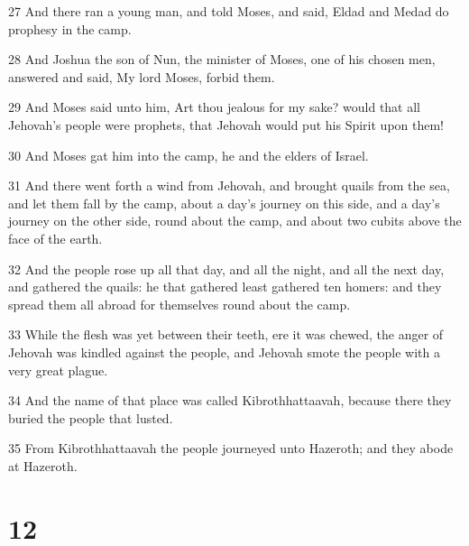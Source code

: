 \par 27 And there ran a young man, and told Moses, and said, Eldad and Medad do prophesy in the camp.
\par 28 And Joshua the son of Nun, the minister of Moses, one of his chosen men, answered and said, My lord Moses, forbid them.
\par 29 And Moses said unto him, Art thou jealous for my sake? would that all Jehovah's people were prophets, that Jehovah would put his Spirit upon them!
\par 30 And Moses gat him into the camp, he and the elders of Israel.
\par 31 And there went forth a wind from Jehovah, and brought quails from the sea, and let them fall by the camp, about a day's journey on this side, and a day's journey on the other side, round about the camp, and about two cubits above the face of the earth.
\par 32 And the people rose up all that day, and all the night, and all the next day, and gathered the quails: he that gathered least gathered ten homers: and they spread them all abroad for themselves round about the camp.
\par 33 While the flesh was yet between their teeth, ere it was chewed, the anger of Jehovah was kindled against the people, and Jehovah smote the people with a very great plague.
\par 34 And the name of that place was called Kibrothhattaavah, because there they buried the people that lusted.
\par 35 From Kibrothhattaavah the people journeyed unto Hazeroth; and they abode at Hazeroth.

\chapter{12}

